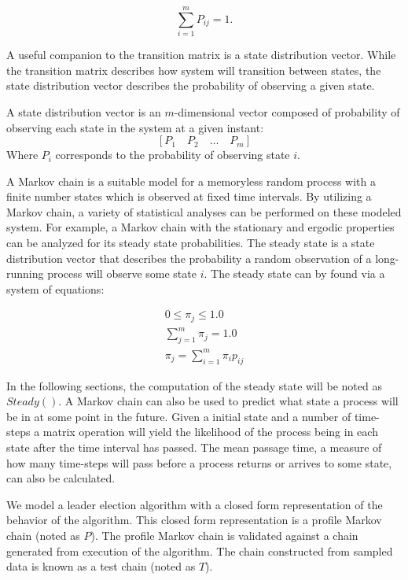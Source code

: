 \begin{equation} \sum_{i=1}^{m} P_{ij} = 1. \end{equation}

A useful companion to the transition matrix is a state distribution vector.
While the transition matrix describes how system will transition between states, the state distribution vector describes the probability of observing a given state.

\begin{pdef}
A state distribution vector is an $m$-dimensional vector composed of probability of observing each state in the system at a given instant:
\[ [P_{1} \quad P_{2} \quad \ldots \quad P_{m} ] \]
Where $P_{i}$ corresponds to the probability of observing state $i$.
\end{pdef}

A Markov chain is a suitable model for a memoryless random process with a finite number states which is observed at fixed time intervals.
By utilizing a Markov chain, a variety of statistical analyses can be performed on these modeled system.
For example, a Markov chain with the stationary and ergodic properties can be analyzed for its steady state probabilities.
The steady state is a state distribution vector that describes the probability a random observation of a long-running process will observe some state $i$.
The steady state can by found via a system of equations: \cite{MARKOV3}

\begin{align}
0\leq\pi_j\leq1.0 \\
\sum_{j = 1}^{m}\pi_j = 1.0 \\
\pi_j = \sum_{i=1}^{m} \pi_i p_{ij}
\end{align}

In the following sections, the computation of the steady state will be noted as $Steady()$.
A Markov chain can also be used to predict what state a process will be in at some point in the future.
Given a initial state and a number of time-steps a matrix operation will yield the likelihood of the process being in each state after the time interval has passed.
The mean passage time, a measure of how many time-steps will pass before a process returns or arrives to some state, can also be calculated.

We model a leader election algorithm with a closed form representation of the behavior of the algorithm.
This closed form representation is a profile Markov chain (noted as $P$).
The profile Markov chain is validated against a chain generated from execution of the algorithm.
The chain constructed from sampled data is known as a test chain (noted as $T$).

